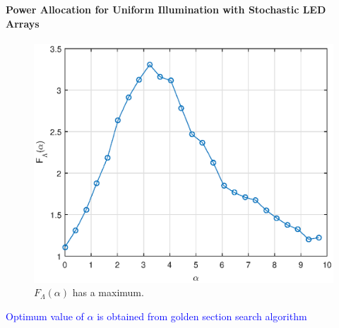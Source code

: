 \documentclass{beamer}
\theoremstyle{remark}
\begin{document}
\begin{frame}
\frametitle{\,}
\framesubtitle{Power Allocation for Uniform Illumination with
Stochastic LED Arrays}
   \begin{figure}[!h]
        \centering
        \includegraphics[width=.6\columnwidth]{QvsAlpha}
        \caption{$F_{\Lambda}(\alpha)$ has a maximum.}
	\label{fig:qconcave}
    \end{figure}
    \textcolor{blue}{Optimum value of $\alpha$ is obtained from golden section search algorithm}
\end{frame}
\end{document}
